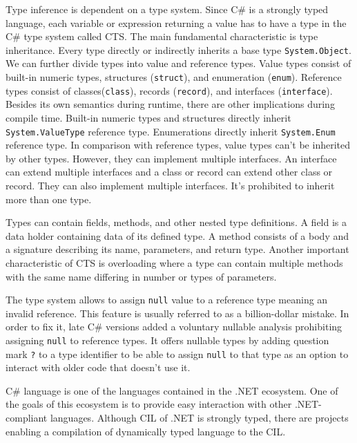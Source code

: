 Type inference is dependent on a type system.
Since C\# is a strongly typed language, each variable or expression returning a value has to have a type in the C\# type system \cite{online:cSharpTypeSystem} called \ac{CTS}.
The main fundamental characteristic is type inheritance.
Every type directly or indirectly inherits a base type \texttt{System.Object}.
We can further divide types into value and reference types.
Value types consist of built-in numeric types, structures (\texttt{struct}), and enumeration (\texttt{enum}).
Reference types consist of classes(\texttt{class}), records (\texttt{record}), and interfaces (\texttt{interface}).
Besides its own semantics during runtime, there are other implications during compile time.
Built-in numeric types and structures directly inherit \texttt{System.ValueType} reference type.
Enumerations directly inherit \texttt{System.Enum} reference type.
In comparison with reference types, value types can't be inherited by other types.
However, they can implement multiple interfaces.
An interface can extend multiple interfaces and a class or record can extend other class or record.
They can also implement multiple interfaces.
It's prohibited to inherit more than one type.
\par
{}
Types can contain fields, methods, and other nested type definitions.
A field is a data holder containing data of its defined type.
A method consists of a body and a signature describing its name, parameters, and return type.
Another important characteristic of \ac{CTS} is overloading where a type can contain multiple methods with the same name differing in number or types of parameters.
\par
{}
The type system allows to assign \texttt{null} value to a reference type meaning an invalid reference.
This feature is usually referred to as a billion-dollar mistake.
In order to fix it, late C\# versions added a voluntary nullable analysis prohibiting assigning \texttt{null} to reference types.
It offers nullable types by adding question mark \texttt{?} to a type identifier to be able to assign \texttt{null} to that type as an option to interact with older code that doesn't use it.
\par
{}
C\# language is one of the languages contained in the .NET ecosystem.
One of the goals of this ecosystem is to provide easy interaction with other .NET-compliant languages.
Although \ac{CIL} of .NET is strongly typed, there are projects enabling a compilation of dynamically typed language to the \ac{CIL}.
